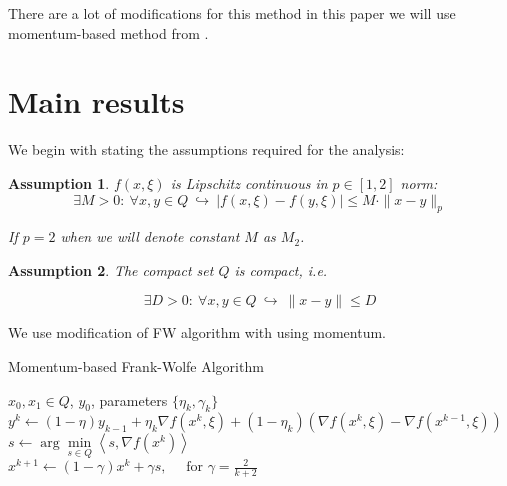 \documentclass{article}
\newtheorem{assumption}{Assumption}
\begin{document}
        There are a lot of modifications for this method \cite{hou2022distributed, sahu2019towards, akhtar2022zeroth} in this paper we will use momentum-based method from \cite{hou2022distributed}.

\section{Main results}

    We begin with stating the assumptions required for the analysis:

    \begin{assumption}\label{ass1}
        $f(x, \xi)$ is Lipschitz continuous in $p \in [1, 2]$ norm:
        \begin{equation}
            \label{Lc}
            \exists M > 0:~ \forall x, y \in Q ~\hookrightarrow~ |f(x, \xi) - f(y, \xi)| \leq M \cdot \|x - y\|_p
        \end{equation}

        If $p=2$ when we will denote constant $M$ as $M_2$.
    \end{assumption}

    \begin{assumption}\label{ass2}
        The compact set $Q$ is compact, i.e. 

        \begin{equation}
            \label{compact Q}
            \exists D > 0 :~ \forall x, y \in Q ~\hookrightarrow~ \|x-y\| \leq D
        \end{equation}
    \end{assumption}

        We use modification of FW algorithm with using momentum.
    
        \begin{algorithm}
            \caption{Momentum-based Frank-Wolfe Algorithm}\label{MBFW algorithm}
            \begin{algorithmic}
                \Require $x_0, x_1 \in Q$, $y_0$, parameters $\{\eta_k, \gamma_k\}$
                \\
                    \State $y^k \gets (1-\eta) y_{k-1} + 
                    \eta_k \nabla f(x^k, \xi) + (1-\eta_k)(\nabla f(x^k, \xi) - \nabla f(x^{k-1}, \xi))$\\

                    \State $s \gets \arg\underset{s \in Q}{\min} \left<s, \nabla f(x^k)\right>$\\

                    \State $x^{k+1} \gets (1 - \gamma)x^k + \gamma s, \quad \text{ for } \gamma = \frac{2}{k+2}$
                \EndFor
            \end{algorithmic}
        \end{algorithm}
\end{document}
